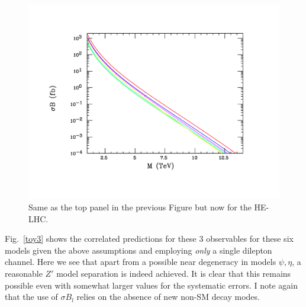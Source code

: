 \documentclass[14pt]{article}
\begin{document}
\begin{figure}[htbp]
\centerline{\includegraphics[width=5.0in,angle=0]{figures/zp27tev-ref.pdf}}
\vspace*{-1.30cm}
\caption{ Same as the top panel in the previous Figure but now for the HE-LHC.}
\label{toy2}
\end{figure}



Fig.~\ref{toy3} shows the correlated predictions for these 3 observables for these six models given the above assumptions and employing {\it only} a single dilepton 
channel. Here we see that apart from a possible near degeneracy in models $\psi,\eta$, a reasonable $Z'$ model separation is indeed achieved. It is clear that this 
remains possible even with somewhat larger values for the systematic errors. I note again that the use of $\sigma B_l$ relies on the absence of new non-SM decay 
modes.
\end{document}
